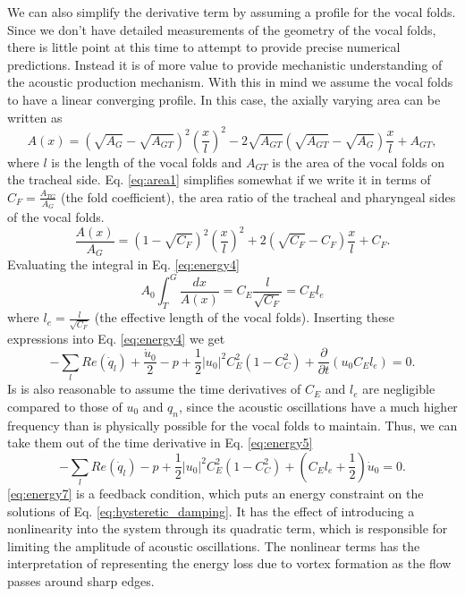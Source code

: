 \documentclass[superscriptaddress, onecolumn, prl]{revtex4}
\begin{document}
We can also simplify the derivative term by assuming a profile for the vocal folds. Since we don't have detailed measurements of the geometry of the vocal folds, there is little point at this time to attempt to provide precise numerical predictions. Instead it is of more value to provide mechanistic understanding of the acoustic production mechanism. With this in mind we assume the vocal folds to have a linear converging profile. In this case, the axially varying area can be written as 
\begin{equation}
\label{eq:area1}
A(x)= \left(\sqrt{A_G}-\sqrt{A_{GT}}\right)^2 \left(\frac{x}{l}  \right)^2- 2 \sqrt{A_{GT}} \left(\sqrt{A_{GT}}-\sqrt{A_G}\right)\frac{x}{l}+A_{GT},
\end{equation}
where $l$ is the length of the vocal folds and $A_{GT}$ is the area of the vocal folds on the tracheal side. Eq. \ref{eq:area1} simplifies somewhat if we write it in terms of $C_F = \frac{A_{TG}}{A_G}$ (the fold coefficient), the area ratio of the tracheal and pharyngeal sides of the vocal folds.
\begin{equation}
\label{eq:area2}
\frac{A(x)}{A_G} = \left( 1-\sqrt{C_F} \right)^2 \left( \frac{x}{l} \right)^2 + 2\left( \sqrt{C_F} - C_F \right) \frac{x}{l} + C_F.
\end{equation}
Evaluating the integral in Eq. \ref{eq:energy4}
\begin{equation}
A_0 \int_{T}^{G} \frac{dx}{A(x)} = C_E  \frac{l}{\sqrt{C_F}} = C_E l_e
\end{equation}
where $l_e =  \frac{l}{\sqrt{C_F}}$ (the effective length of the vocal folds). Inserting these expressions into Eq. \ref{eq:energy4} we get
\begin{equation}
\label{eq:energy6}
-\sum_l{Re(\dot{q}_l)} + \frac{\dot{u}_0}{2} - p + \frac{1}{2} |u_{0}|^2 C_E^2 \left( 1 - C_C^2 \right) + \frac{\partial}{\partial t}( u_{0} C_E l_e ) = 0.
\end{equation} 
Is is also reasonable to assume the time derivatives of $C_E$ and $l_e$ are negligible compared to those of $u_0$ and $q_n$, since the acoustic oscillations have a much higher frequency than is physically possible for the vocal folds to maintain. Thus, we can take them out of the time derivative in Eq. \ref{eq:energy5}
\begin{equation}
\label{eq:energy7}
-\sum_l{Re(\dot{q}_l)} - p + \frac{1}{2} |u_{0}|^2 C_E^2 \left( 1 - C_C^2 \right) + \left( C_E l_e + \frac{1}{2}  \right) \dot{u}_0 = 0.
\end{equation} 
\ref{eq:energy7} is a feedback condition, which puts an energy constraint on the solutions of Eq. \ref{eq:hysteretic_damping}. It has the effect of introducing a nonlinearity into the system through its quadratic term, which is responsible for limiting the amplitude of acoustic oscillations. The nonlinear terms has the interpretation of representing the energy loss due to vortex formation as the flow passes around sharp edges.
\end{document}
